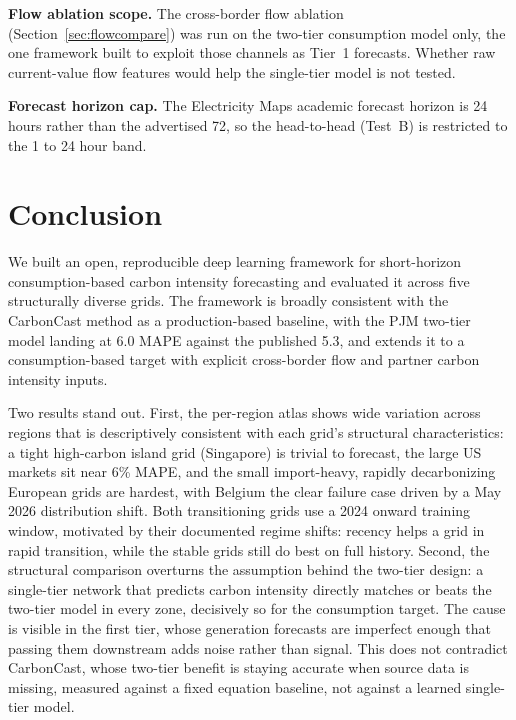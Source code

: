 \documentclass[sigconf,nonacm,a4paper]{acmart}  %
\begin{document}
\textbf{Flow ablation scope.} The cross-border flow ablation
(Section~\ref{sec:flowcompare}) was run on the two-tier consumption model only,
the one framework built to exploit those channels as Tier~1 forecasts. Whether
raw current-value flow features would help the single-tier model is not tested.

\textbf{Forecast horizon cap.} The Electricity Maps academic forecast horizon is
24 hours rather than the advertised 72, so the head-to-head (Test~B) is restricted
to the 1 to 24 hour band.

\section{Conclusion}
\label{sec:conclusion}
We built an open, reproducible deep learning framework for short-horizon
consumption-based carbon intensity forecasting and evaluated it across five
structurally diverse grids. The framework is broadly consistent with the CarbonCast
method as a production-based baseline, with the PJM two-tier model landing at
6.0 MAPE against the published 5.3, and extends it to a consumption-based target
with explicit cross-border flow and partner carbon intensity inputs.

Two results stand out. First, the per-region atlas shows wide variation across
regions that is descriptively consistent with each grid's structural characteristics:
a tight high-carbon island grid (Singapore) is trivial to forecast, the large US
markets sit near 6\% MAPE, and the small import-heavy, rapidly decarbonizing
European grids are hardest, with Belgium the clear failure case driven by a May 2026
distribution shift. Both transitioning grids use a 2024 onward training window, motivated by their
documented regime shifts: recency helps a grid in rapid transition, while the
stable grids still do best on full history.
Second, the structural comparison overturns the assumption behind the two-tier
design: a single-tier network that predicts carbon intensity directly matches or
beats the two-tier model in every zone, decisively so for the consumption target.
The cause is visible in the first tier, whose generation forecasts are imperfect
enough that passing them downstream adds noise rather than signal. This does not
contradict CarbonCast, whose two-tier benefit is staying accurate when source
data is missing, measured against a fixed equation baseline, not against a learned
single-tier model.
\end{document}
